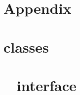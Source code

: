 \documentclass[11pt,a4paper]{article}
\renewcommand{\theequation}{\arabic{section}.\arabic{equation}}
\begin{document}
\setcounter{section}{0}
\section*{Appendix}
\appendix

\renewcommand{\theequation}{\Alph{section}.\arabic{equation}}
\setcounter{equation}{0}  %







\section{\CPP classes}\label{app:classes}
\setcounter{equation}{0}


\section{\nsc~  \PY interface}\label{app:modules}
\setcounter{equation}{0}
\end{document}
